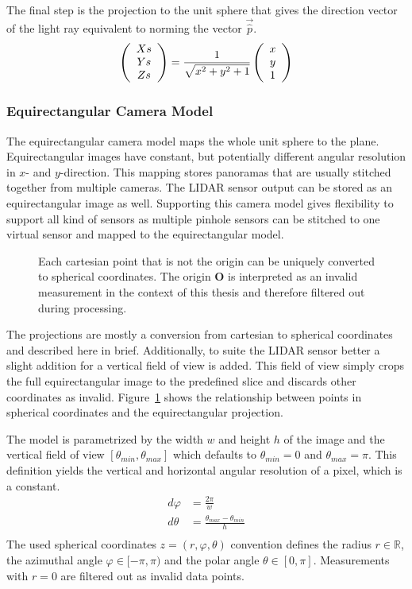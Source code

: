 The final step is the projection to the unit sphere that gives the direction vector of the light ray equivalent to norming the vector $\vec{\hat{p}}$.
\begin{equation}
    \left(\begin{array}{c} Xs \\ Ys \\ Zs \end{array}\right) = \frac{1}{\sqrt{x^2 + y^2 + 1}} \left(\begin{array}{c} x \\ y \\ 1 \end{array}\right)
    \label{eq:pinhole_backward}
\end{equation}

\subsubsection{Equirectangular Camera Model}

The equirectangular camera model maps the whole unit sphere to the plane.
Equirectangular images have constant, but potentially different angular resolution in $x$- and $y$-direction.
This mapping stores panoramas that are usually stitched together from multiple cameras.
The \acrshort{LIDAR} sensor output can be stored as an equirectangular image as well.
Supporting this camera model gives flexibility to support all kind of sensors as multiple pinhole sensors can be stitched to one virtual sensor and mapped to the equirectangular model.

\begin{figure}[H]
    \scalebox{0.9}{%
    
    }
    \caption[Spherical Camera Model and Equirectangular Images]{Each cartesian point that is not the origin can be uniquely converted to spherical coordinates. The origin $\mathbf{O}$ is interpreted as an invalid measurement in the context of this thesis and therefore filtered out during processing.}\label{fig:spherical}
\end{figure}

The projections are mostly a conversion from cartesian to spherical coordinates and described here in brief.
Additionally, to suite the \acrshort{LIDAR} sensor better a slight addition for a vertical field of view is added.
This field of view simply crops the full equirectangular image to the predefined slice and discards other coordinates as invalid.
Figure~\ref{fig:spherical} shows the relationship between points in spherical coordinates and the equirectangular projection.

The model is parametrized by the width $w$ and height $h$ of the image and the vertical field of view $[\theta_{min}, \theta_{max}]$ which defaults to $\theta_{min} = 0$ and $\theta_{max} = \pi$.
This definition yields the vertical and horizontal angular resolution of a pixel, which is a constant.
\begin{equation}
\label{eq:equi_angular_resolution}
\begin{aligned}
    d\varphi &= \frac{2 \pi}{w} \\
    d\theta &= \frac{\theta_{max} - \theta_{min}}{h} \\
\end{aligned}
\end{equation}
The used spherical coordinates $z = (r, \varphi, \theta)$ convention defines the radius $r \in \mathbb{R}$, the azimuthal angle $\varphi \in [-\pi, \pi)$ and the polar angle $\theta \in [0, \pi]$.
Measurements with $r = 0$ are filtered out as invalid data points.

